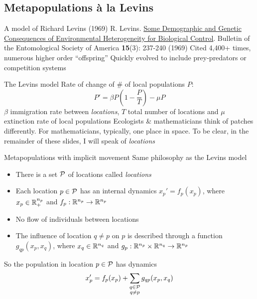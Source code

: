 \documentclass[aspectratio=43]{beamer}
\begin{document}
\subsection[Implicit movement]{Metapopulations \`a la Levins}

\begin{frame}{A model of Richard Levins (1969)}
    R. Levins. \href{https://doi.org/10.1093/besa/15.3.237}{Some Demographic and Genetic Consequences of Environmental Heterogeneity for Biological Control}. 
    Bulletin of the Entomological Society of America \textbf{15}(3): 237-240 (1969)
    \vfill
    Cited 4,400+ times, numerous higher order ``offspring''
	\vfill
	Quickly evolved to include prey-predators or competition systems
\end{frame}

\begin{frame}{The Levins model}
Rate of change of \# of local populations $P$:
\begin{equation}
P' = \beta P \left( 1 - \frac{P}{T} \right) -\mu P
\label{eq:Levins}
\end{equation}
$\beta$ immigration rate between \emph{locations}, $T$ total number of locations and $\mu$ extinction rate of local populations
\vfill
Ecologists \& mathematicians think of patches differently. For mathematicians, typically, one place in space. To be clear, in the remainder of these slides, I will speak of \emph{locations}
\end{frame}

\begin{frame}{Metapopulations with implicit movement}
    Same philosophy as the Levins model
    \vfill
    \begin{itemize}
        \item There is a set $\P$ of locations called \emph{locations}
        \item Each location $p\in\P$ has an internal dynamics $x_p'=f_p(x_p)$, where $x_p\in\IR_+^{n_p}$ and $f_p:\IR^{n_p}\to \IR^{n_p}$
        \item No flow of individuals between locations
        \item The influence of location $q\neq p$ on $p$ is described through a function $g_{qp}(x_p,x_q)$, where $x_q\in\IR^{n_q}$ and $g_p:\IR^{n_p}\times\IR^{n_q}\to\IR^{n_p}$
    \end{itemize}
    \vfill
    So the population in location $p\in\P$ has dynamics
    \begin{equation}\label{eq:metapop_implicit_mvt_generic}
        x_p' = f_p(x_p)
        +\sum\dind{q\in\P}{q\neq p}
        g_{qp}(x_p,x_q)
    \end{equation}
\end{frame}
\end{document}
